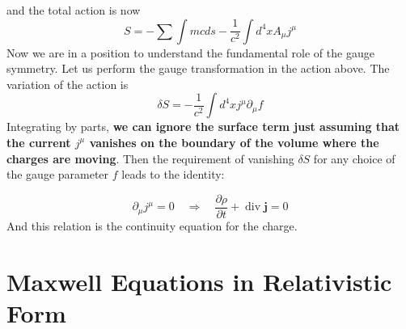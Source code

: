 and the total action is now
\begin{equation}
S=-\sum \int m c d s-\frac{1}{c^{2}} \int d^{4} x A_{\mu} j^{\mu}
\end{equation}
Now we are in a position to understand the fundamental role of the gauge symmetry. Let us perform the gauge transformation in the action above. The variation of the action is
\begin{equation}
\delta S=-\frac{1}{c^{2}} \int d^{4} x j^{\mu} \partial_{\mu} f
\label{charge-action}
\end{equation}
Integrating by parts, \textbf{we can ignore the surface term just assuming that the current $j^{\mu}$ vanishes on the boundary of the volume where the charges are moving}. Then the requirement of vanishing $\delta S$ for any choice of the gauge parameter $f$ leads to the identity:
\begin{qt}
    \begin{equation}
\partial_{\mu} j^{\mu}=0 \quad \Longrightarrow \quad \frac{\partial \rho}{\partial t}+\operatorname{div} \mathbf{j}=0
\end{equation}
And this relation is the continuity equation for the charge.
\end{qt}

\section{Maxwell Equations in Relativistic Form}
